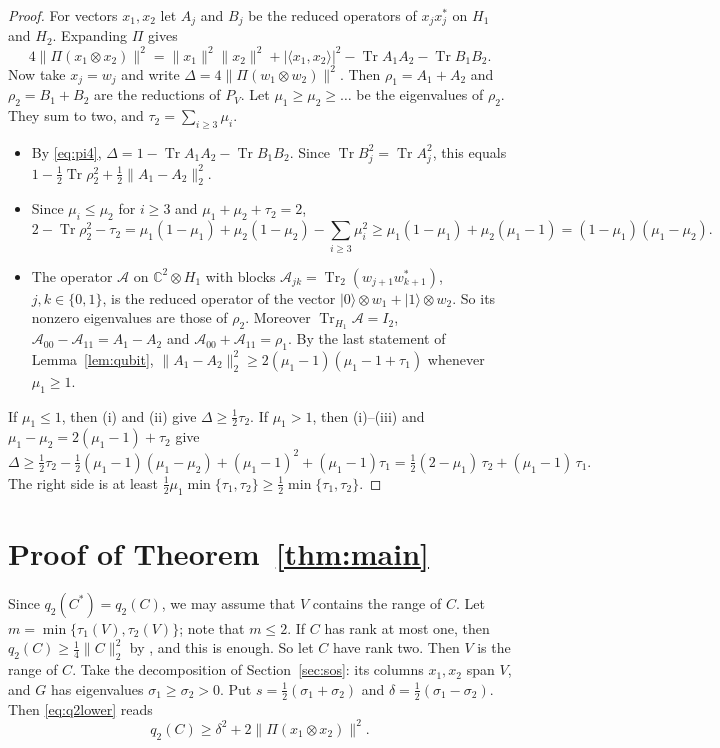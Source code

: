 \documentclass[11pt]{article}
\theoremstyle{remark}
\newcommand{\Tr}{\operatorname{Tr}}
\newcommand{\norm}[1]{\lVert #1\rVert}
\begin{document}
\begin{proof}
For vectors $x_1,x_2$ let $A_j$ and $B_j$ be the reduced operators of $x_jx_j^*$ on $H_1$ and $H_2$. Expanding $\Pi$
gives
\begin{equation}\label{eq:pi4}
4\norm{\Pi(x_1\otimes x_2)}^2=\norm{x_1}^2\norm{x_2}^2+|\langle x_1,x_2\rangle|^2-\Tr A_1A_2-\Tr B_1B_2 .
\end{equation}
Now take $x_j=w_j$ and write $\Delta=4\norm{\Pi(w_1\otimes w_2)}^2$. Then $\rho_1=A_1+A_2$ and $\rho_2=B_1+B_2$ are the
reductions of $P_V$. Let $\mu_1\ge\mu_2\ge\dots$ be the eigenvalues of $\rho_2$. They sum to two, and
$\tau_2=\sum_{i\ge3}\mu_i$.
\begin{itemize}
\item[(i)] By \eqref{eq:pi4}, $\Delta=1-\Tr A_1A_2-\Tr B_1B_2$. Since $\Tr B_j^2=\Tr A_j^2$, this equals
$1-\frac12\Tr\rho_2^2+\frac12\norm{A_1-A_2}_2^2$.
\item[(ii)] Since $\mu_i\le\mu_2$ for $i\ge3$ and $\mu_1+\mu_2+\tau_2=2$,
\[
2-\Tr\rho_2^2-\tau_2=\mu_1(1-\mu_1)+\mu_2(1-\mu_2)-\sum_{i\ge3}\mu_i^2\ge\mu_1(1-\mu_1)+\mu_2(\mu_1-1)
=(1-\mu_1)(\mu_1-\mu_2).
\]
\item[(iii)] The operator $\mathcal A$ on $\mathbb C^2\otimes H_1$ with blocks $\mathcal A_{jk}=\Tr_2(w_{j+1}w_{k+1}^*)$,
$j,k\in\{0,1\}$,
is the reduced operator of the vector $|0\rangle\otimes w_1+|1\rangle\otimes w_2$. So its nonzero eigenvalues are those
of $\rho_2$. Moreover $\Tr_{H_1}\mathcal A=I_2$, $\mathcal A_{00}-\mathcal A_{11}=A_1-A_2$ and
$\mathcal A_{00}+\mathcal A_{11}=\rho_1$. By the last statement of Lemma~\ref{lem:qubit},
$\norm{A_1-A_2}_2^2\ge2(\mu_1-1)(\mu_1-1+\tau_1)$ whenever $\mu_1\ge1$.
\end{itemize}
If $\mu_1\le1$, then (i) and (ii) give $\Delta\ge\frac12\tau_2$. If $\mu_1>1$, then (i)--(iii) and
$\mu_1-\mu_2=2(\mu_1-1)+\tau_2$ give
\[
\Delta\ge\tfrac12\tau_2-\tfrac12(\mu_1-1)(\mu_1-\mu_2)+(\mu_1-1)^2+(\mu_1-1)\tau_1
=\tfrac12(2-\mu_1)\,\tau_2+(\mu_1-1)\,\tau_1 .
\]
The right side is at least $\frac12\mu_1\min\{\tau_1,\tau_2\}\ge\frac12\min\{\tau_1,\tau_2\}$.
\end{proof}

\section{Proof of Theorem~\ref{thm:main}}\label{sec:proof}

Since $q_2(C^*)=q_2(C)$, we may assume that $V$ contains the range of $C$. Let $m=\min\{\tau_1(V),\tau_2(V)\}$;
note that $m\le2$. If $C$ has rank at most one, then $q_2(C)\ge\frac14\norm{C}_2^2$ by \cite[Prop.~8]{SongChen}, and
this is enough. So let $C$ have rank two. Then $V$ is the range of $C$. Take the decomposition of
Section~\ref{sec:sos}: its columns $x_1,x_2$ span $V$, and $G$ has eigenvalues $\sigma_1\ge\sigma_2>0$. Put
$s=\frac12(\sigma_1+\sigma_2)$ and $\delta=\frac12(\sigma_1-\sigma_2)$. Then \eqref{eq:q2lower} reads
\[
q_2(C)\ge\delta^2+2\norm{\Pi(x_1\otimes x_2)}^2 .
\]
\end{document}
